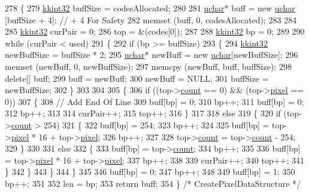\begin{DoxyCode}
278 \{
279   \hyperlink{namespace_k_k_b_a8fa4952cc84fda1de4bec1fbdd8d5b1b}{kkint32}  buffSize = codesAllocated;
280 
281   \hyperlink{namespace_k_k_b_ace9969169bf514f9ee6185186949cdf7}{uchar}* buff = \textcolor{keyword}{new} \hyperlink{namespace_k_k_b_ace9969169bf514f9ee6185186949cdf7}{uchar} [buffSize + 4];  \textcolor{comment}{// + 4 For Safety}
282   memset (buff, 0, codesAllocated);
283 
284 
285   \hyperlink{namespace_k_k_b_a8fa4952cc84fda1de4bec1fbdd8d5b1b}{kkint32}  curPair = 0;
286   top = &(codes[0]);
287 
288   \hyperlink{namespace_k_k_b_a8fa4952cc84fda1de4bec1fbdd8d5b1b}{kkint32}  bp = 0;
289 
290   \textcolor{keywordflow}{while}  (curPair < used)
291   \{
292     \textcolor{keywordflow}{if}  (bp >= buffSize)
293     \{
294       \hyperlink{namespace_k_k_b_a8fa4952cc84fda1de4bec1fbdd8d5b1b}{kkint32}  newBuffSize = buffSize * 2;
295       \hyperlink{namespace_k_k_b_ace9969169bf514f9ee6185186949cdf7}{uchar}* newBuff = \textcolor{keyword}{new} \hyperlink{namespace_k_k_b_ace9969169bf514f9ee6185186949cdf7}{uchar}[newBuffSize];
296       memset (newBuff, 0, newBuffSize);
297       memcpy (newBuff, buff, buffSize);
298       \textcolor{keyword}{delete}[] buff;
299       buff = newBuff;
300       newBuff = NULL;
301       buffSize = newBuffSize;
302     \}
303 
304 
305     \{
306       \textcolor{keywordflow}{if}  ((top->\hyperlink{struct_bmp_image_1_1_code_pair_a1501fa5638588a3a7afdbbfb62327dae}{count} == 0)  &&  (top->\hyperlink{struct_bmp_image_1_1_code_pair_ac341a7d727f931dc9c446eb1d67fe022}{pixel} == 0))
307       \{
308         \textcolor{comment}{// Add End Of Line }
309         buff[bp] = 0;
310         bp++;
311         buff[bp] = 0;
312         bp++;
313 
314         curPair++;
315         top++;
316       \}
317 
318       \textcolor{keywordflow}{else}
319       \{
320         \textcolor{keywordflow}{if}  (top->\hyperlink{struct_bmp_image_1_1_code_pair_a1501fa5638588a3a7afdbbfb62327dae}{count} > 254)
321         \{
322           buff[bp] = 254;
323           bp++;
324 
325           buff[bp] = top->\hyperlink{struct_bmp_image_1_1_code_pair_ac341a7d727f931dc9c446eb1d67fe022}{pixel} * 16 + top->\hyperlink{struct_bmp_image_1_1_code_pair_ac341a7d727f931dc9c446eb1d67fe022}{pixel};
326           bp++;
327 
328           top->\hyperlink{struct_bmp_image_1_1_code_pair_a1501fa5638588a3a7afdbbfb62327dae}{count} = top->\hyperlink{struct_bmp_image_1_1_code_pair_a1501fa5638588a3a7afdbbfb62327dae}{count} - 254;
329         \}
330 
331         \textcolor{keywordflow}{else}
332         \{
333           buff[bp] = top->\hyperlink{struct_bmp_image_1_1_code_pair_a1501fa5638588a3a7afdbbfb62327dae}{count};
334           bp++;
335 
336           buff[bp] = top->\hyperlink{struct_bmp_image_1_1_code_pair_ac341a7d727f931dc9c446eb1d67fe022}{pixel} * 16 + top->\hyperlink{struct_bmp_image_1_1_code_pair_ac341a7d727f931dc9c446eb1d67fe022}{pixel};
337           bp++;
338 
339           curPair++;
340           top++;
341         \}
342       \}
343     \}
344   \}
345 
346   buff[bp] = 0;
347   bp++;
348 
349   buff[bp] = 1;
350   bp++;
351 
352   len = bp;     
353   \textcolor{keywordflow}{return}  buff;
354 \} \textcolor{comment}{/* CreatePixelDataStructure */}
\end{DoxyCode}
